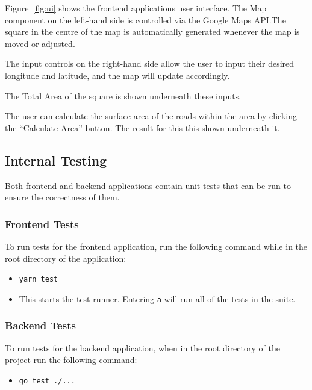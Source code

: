 \documentclass[a4paper,11pt]{article}
\def\code#1{\texttt{#1}}
\begin{document}
Figure~\ref{fig:ui} shows the frontend applications user interface. The Map
component on the left-hand side is controlled via the Google Maps API.\@ The
square in the centre of the map is automatically generated whenever the map is
moved or adjusted.

The input controls on the right-hand side allow the user to input their desired
longitude and latitude, and the map will update accordingly.

The Total Area of the square is shown underneath these inputs.

The user can calculate the surface area of the roads within the area by clicking
the ``Calculate Area'' button. The result for this this shown underneath it.

\subsection{Internal Testing}

Both frontend and backend applications contain unit tests that can be run to
ensure the correctness of them.

\subsubsection{Frontend Tests}

To run tests for the frontend application, run the following command while in
the root directory of the application:

\begin{itemize}
  \item \code{yarn test}
  \item This starts the test runner. Entering \code{a} will run all of the tests
    in the suite.
\end{itemize}

\subsubsection{Backend Tests}

To run tests for the backend application, when in the root directory of the
project run the following command:

\begin{itemize}
  \item \code{go test ./...}
\end{itemize}
\end{document}
